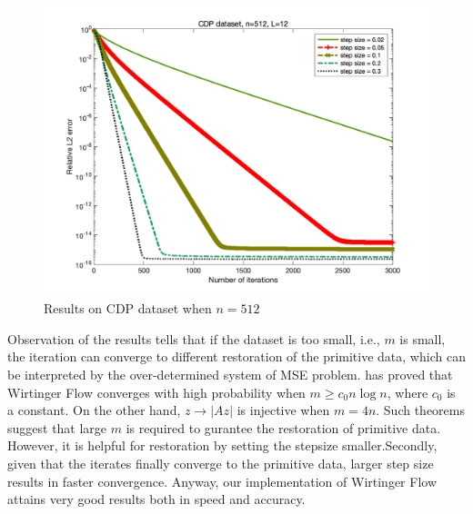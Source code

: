 \documentclass{article}
\begin{document}
\begin{figure}
\begin{minipage}{0.33\linewidth}
		\includegraphics[width=1\linewidth]{./fig/CDP+32.png}
		\caption{$L=12$}
	\end{minipage}
	\caption*{Results on CDP dataset when $n=512$}
\end{figure}

Observation of the results tells that if the dataset is too small, i.e., $m$ is small, the iteration can converge to different restoration of the primitive data, which can be interpreted by the over-determined system of MSE problem. \cite{candes2015phase} has proved that Wirtinger Flow converges with high probability when $m\ge c_0n\log n$, where $c_0$ is a constant. On the other hand, $z\to |Az|$ is injective when $m=4n$. Such theorems suggest that large $m$ is required to gurantee the restoration of primitive data. However, it is helpful for restoration by setting the stepsize smaller.Secondly, given that the iterates finally converge to the primitive data, larger step size results in faster convergence. Anyway, our implementation of Wirtinger Flow attains very good results both in speed and accuracy.


\nocite{*}
  

\end{document}
